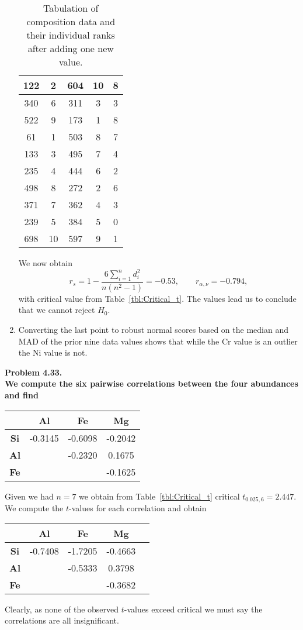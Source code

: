 \begin{enumerate}[label=\alph*)]
\begin{table}[h]
\begin{tabular}{|c|c|c|c|c|}
122	&	2	& 604 &	10	& 8\\ \hline
340	&	6	& 311 &	3	& 3\\ \hline
522	&	9	& 173 &	1	& 8\\ \hline
61	&	1	& 503 &	8	& 7\\ \hline
133	&	3	& 495 &	7	& 4\\ \hline
235	&	4	& 444 &	6	& 2\\ \hline
498	&	8	& 272 &	2	& 6\\ \hline
371	&	7	& 362 &	4	& 3\\ \hline
239	&	5	& 384 &	5	& 0\\ \hline
698	&	10	& 597 &	9	& 1\\ \hline
\end{tabular}
\caption{Tabulation of composition data and their individual ranks after adding one new value.}
\label{tbl:components2}
\end{table}
We now obtain
$$
r_s = 1 - \frac{6\sum_{i=1}^n d_i^2}{n(n^2 - 1)} = -0.53, \quad \quad r_{\alpha,\nu} = -0.794,
$$
with critical value from Table~\ref{tbl:Critical_t}. The values lead us to conclude that we cannot reject $H_0$.
\item Converting the last point to robust normal scores based on the median and MAD of the prior nine data values
shows that while the Cr value is an outlier the Ni value is not.
\end{enumerate}


\noindent
\bf{Problem 4.33.} \\

We compute the six pairwise correlations between the four abundances and find
\begin{table}[H]
\centering
\begin{tabular}{|c|c|c|c|} \hline
   	& \bf{Al} & \bf{Fe} & \bf{Mg} \\ \hline
\bf{Si}	&   -0.3145	& -0.6098	& -0.2042 \\ \hline
\bf{Al}	&    	& -0.2320	& 0.1675 \\ \hline
\bf{Fe}	&    	&  	& -0.1625 \\ \hline
\end{tabular}
\end{table}
Given we had $n=7$ we obtain from Table~\ref{tbl:Critical_t} critical $t_{0.025,6} = 2.447$.
We compute the $t$-values for each correlation and obtain
\begin{table}[H]
\centering
\begin{tabular}{|c|c|c|c|c|} \hline
   	& \bf{Al} & \bf{Fe} & \bf{Mg} \\ \hline
\bf{Si}	&   -0.7408	& -1.7205	& -0.4663 \\ \hline
\bf{Al}	&   	& -0.5333	& 0.3798 \\ \hline
\bf{Fe}	&   	&  	& -0.3682 \\ \hline
\end{tabular}
\end{table}
Clearly, as none of the observed $t$-values exceed critical we must say the correlations
are all insignificant.

